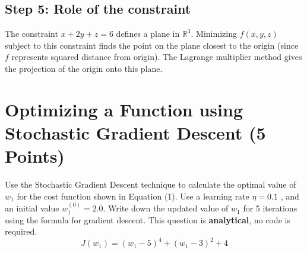 \documentclass[12pt, xcolor=dvipsnames,svgnames,x11names]{article}
\begin{document}
\begin{answerbox}
\subsection*{Step 5: Role of the constraint}
The constraint $x + 2y + z = 6$ defines a plane in $\mathbb{R}^3$. Minimizing $f(x, y, z)$ subject to this constraint finds the point on the plane closest to the origin (since $f$ represents squared distance from origin). The Lagrange multiplier method gives the projection of the origin onto this plane.
\end{answerbox}

\section{Optimizing a Function using Stochastic Gradient Descent (5 Points)}
Use the Stochastic Gradient Descent technique to calculate the optimal value of 
$w_1$ for the cost function shown in Equation (1). Use a learning rate 
$\eta = 0.1$ , and an initial value 
$w_1^{(0)} = 2.0$.
Write down the updated value of 
$w_1$ for 5 iterations using the formula for gradient descent. \newline
This question is \textbf{analytical}, no code is required.
\begin{equation}
    J(w_1) = (w_1-5)^4 + (w_1-3)^2 +  4
\end{equation}
\end{document}
